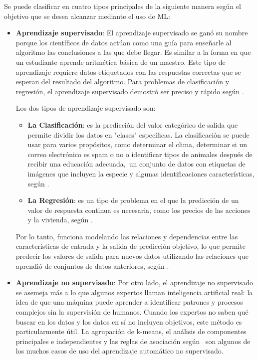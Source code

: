 Se puede clasificar en cuatro tipos principales de la siguiente manera según el objetivo que se desea alcanzar mediante el uso de ML:
\begin{itemize}
	\item \textbf{Aprendizaje supervisado}: El aprendizaje supervisado se ganó su nombre porque los científicos de datos actúan como una guía para enseñarle al algoritmo las conclusiones a las que debe llegar. Es similar a la forma en que un estudiante aprende aritmética básica de un maestro. Este tipo de aprendizaje requiere datos etiquetados con las respuestas correctas que se esperan del resultado del algoritmo. Para problemas de clasificación y regresión, el aprendizaje supervisado demostró ser preciso y rápido según \parencite{bk_zambrano2018supnosup}.
	
	Los dos tipos de aprendizaje supervisado son:

	\begin{itemize}
		\item \textbf{La Clasificación}: es la predicción del valor categórico de salida que permite dividir los datos en "clases" específicas. La clasificación se puede usar para varios propósitos, como determinar el clima, determinar si un correo electrónico es spam o no o identificar tipos de animales después de recibir una educación adecuada, un conjunto de datos con etiquetas de imágenes que incluyen la especie y algunas identificaciones características, según \parencite{bk_zambrano2018supnosup}.
		\item \textbf{La Regresión}: es un tipo de problema en el que la predicción de un valor de respuesta continua es necesaria, como los precios de las acciones y la vivienda, según \parencite{bk_zambrano2018supnosup}.
	\end{itemize}

	Por lo tanto, funciona modelando las relaciones y dependencias entre las características de entrada y la salida de predicción objetivo, lo que permite predecir los valores de salida para nuevos datos utilizando las relaciones que aprendió de conjuntos de datos anteriores, según \parencite{bk_alpaydin2014ml}.

	\item \textbf{Aprendizaje no supervisado}: Por otro lado, el aprendizaje no supervisado se asemeja más a lo que algunos expertos llaman inteligencia artificial real: la idea de que una máquina puede aprender a identificar patrones y procesos complejos sin la supervisión de humanos. Cuando los expertos no saben qué buscar en los datos y los datos en sí no incluyen objetivos, este método es particularmente útil. La agrupación de k-means, el análisis de componentes principales e independientes y las reglas de asociación según \parencite{bk_zambrano2018supnosup} son algunos de los muchos casos de uso del aprendizaje automático no supervisado.
	

\end{itemize}
